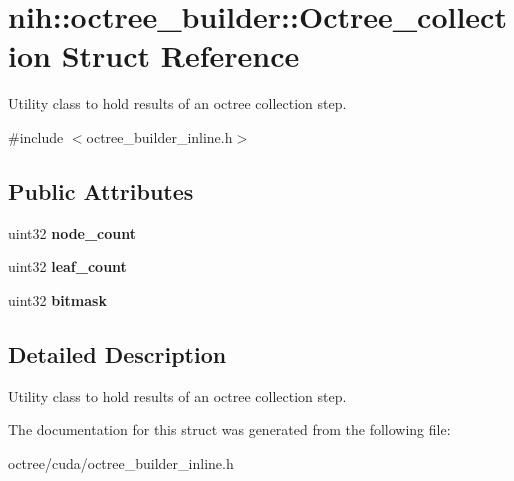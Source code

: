 \hypertarget{structnih_1_1octree__builder_1_1_octree__collection}{
\section{nih\-:\-:octree\-\_\-builder\-:\-:\-Octree\-\_\-collection \-Struct \-Reference}
\label{structnih_1_1octree__builder_1_1_octree__collection}
}


\-Utility class to hold results of an octree collection step.  




{\ttfamily \#include $<$octree\-\_\-builder\-\_\-inline.\-h$>$}

\subsection*{\-Public \-Attributes}
\begin{DoxyCompactItemize}
\item 
\hypertarget{structnih_1_1octree__builder_1_1_octree__collection_ae76a8db6a832f216c484c40f6fce3be2}{
uint32 {\bfseries node\-\_\-count}}
\label{structnih_1_1octree__builder_1_1_octree__collection_ae76a8db6a832f216c484c40f6fce3be2}

\item 
\hypertarget{structnih_1_1octree__builder_1_1_octree__collection_a09baa2dbea46563007ecd94df08b6e6a}{
uint32 {\bfseries leaf\-\_\-count}}
\label{structnih_1_1octree__builder_1_1_octree__collection_a09baa2dbea46563007ecd94df08b6e6a}

\item 
\hypertarget{structnih_1_1octree__builder_1_1_octree__collection_a2429769caa3e63f43db722bd6c8fde9b}{
uint32 {\bfseries bitmask}}
\label{structnih_1_1octree__builder_1_1_octree__collection_a2429769caa3e63f43db722bd6c8fde9b}

\end{DoxyCompactItemize}


\subsection{\-Detailed \-Description}
\-Utility class to hold results of an octree collection step. 

\-The documentation for this struct was generated from the following file\-:\begin{DoxyCompactItemize}
\item 
octree/cuda/octree\-\_\-builder\-\_\-inline.\-h\end{DoxyCompactItemize}

